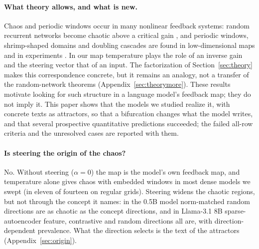 \documentclass[11pt,letterpaper]{article}
\begin{document}
\paragraph{What theory allows, and what is new.} Chaos and periodic windows occur in many nonlinear feedback systems:
random recurrent networks become chaotic above a critical gain \cite{sompolinsky1988chaos,doyon1994bifurcations},
and periodic windows, shrimp-shaped domains and doubling cascades are found in low-dimensional maps and in
experiments \cite{feigenbaum1978quantitative,gallas1993structure,stoop2010real}. In our map temperature plays the role
of an inverse gain and the steering vector that of an input. The factorization of Section~\ref{sec:theory} makes this
correspondence concrete, but it remains an analogy, not a transfer of the random-network theorems
(Appendix~\ref{sec:theorymore}). These results motivate looking for such structure in a language model's feedback
map; they do not imply it. This paper shows that the models we studied realize it, with concrete texts as
attractors, so that a bifurcation changes what the model writes, and that several prospective quantitative
predictions succeeded; the failed all-row criteria and the unresolved cases are reported with them.
\paragraph{Is steering the origin of the chaos?} No. Without steering ($\alpha=0$) the map is the model's own feedback
map, and temperature alone gives chaos with embedded windows in most dense models we swept (in eleven of fourteen on
regular grids). Steering widens the chaotic regions, but not through the concept it names: in the 0.5B model
norm-matched random directions are as chaotic as the concept directions, and in Llama-3.1 8B sparse-autoencoder
feature, contrastive and random directions all are, with direction-dependent prevalence. What the direction selects is
the text of the attractors (Appendix~\ref{sec:origin}).
\end{document}
